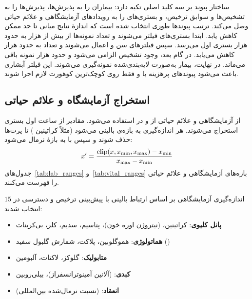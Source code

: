 ساختار پیوند بر سه کلید اصلی تکیه دارد: \texttt{} بیماران را به پذیرش‌ها، \texttt{} پذیرش‌ها را به تشخیص‌ها و سوابق ترخیص، و \texttt{} بستری‌های  را به رویدادهای آزمایشگاهی و علائم حیاتی وصل می‌کند. ترتیب پیوندها طوری انتخاب شده است که اندازۀ نتایج میانی تا حد ممکن کاهش یابد. ابتدا بستری‌های  فیلتر می‌شوند و تعداد نمونه‌ها از بیش از  هزار به حدود  هزار بستری اول می‌رسد. سپس فیلترهای سن و  اعمال می‌شوند و تعداد به حدود  هزار کاهش می‌یابد. در گام بعد، وجود تشخیص  الزامی می‌شود و حدود  هزار نمونه باقی می‌ماند. در نهایت،  بیمار به‌صورت لایه‌بندی‌شده نمونه‌گیری می‌شوند. این فیلتر آبشاری باعث می‌شود پیوندهای پرهزینه با \texttt{} و \texttt{} فقط روی کوچک‌ترین کوهورت لازم اجرا شوند.

\subsection{استخراج آزمایشگاه و علائم حیاتی}

از   آزمایشگاهی و   علائم حیاتی از \texttt{} و \texttt{} در  استفاده می‌شود. مقادیر از  ساعت اول بستری  استخراج می‌شوند. هر اندازه‌گیری به بازه‌ی بالینی  می‌شود (مثلاً کراتینین ) تا پرت‌ها حذف شوند و سپس با  به بازۀ \cnum{[0,1]} نرمال می‌شود:
\begin{equation}
x' = \frac{\text{clip}(x, x_{\min}, x_{\max}) - x_{\min}}{x_{\max} - x_{\min}}
\end{equation}
جدول‌های~\ref{tab:lab_ranges} و~\ref{tab:vital_ranges} بازه‌های آزمایشگاهی و علائم حیاتی را فهرست می‌کنند.



$15$ اندازه‌گیری آزمایشگاهی بر اساس ارتباط بالینی با پیش‌بینی ترخیص  و دسترسی در  انتخاب شدند:
\begin{itemize}
\item \textbf{پانل کلیوی}: کراتینین،  (نیتروژن اوره خون)، پتاسیم، سدیم، کلر، بی‌کربنات
\item \textbf{هماتولوژی}: هموگلوبین، پلاکت، شمارش گلبول سفید ()
\item \textbf{متابولیک}: گلوکز، لاکتات، آلبومین
\item \textbf{کبدی}:  (آلانین آمینوترانسفراز)، بیلی‌روبین
\item \textbf{انعقاد}:  (نسبت نرمال‌شده بین‌المللی)
\end{itemize}

